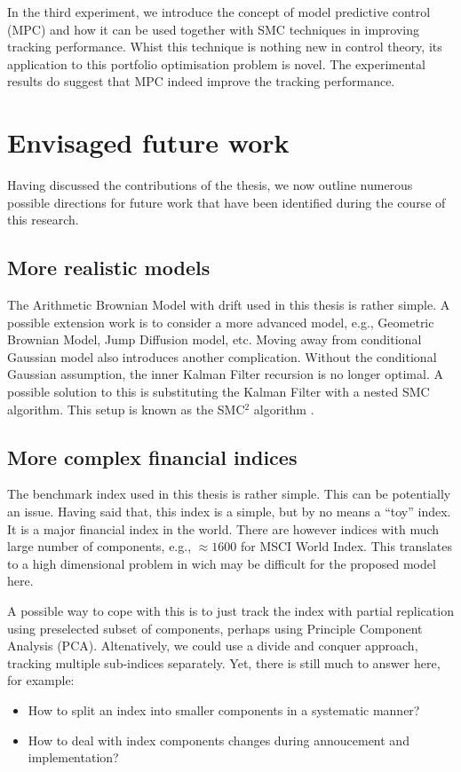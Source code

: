 In the third experiment, we introduce the concept of model predictive control (MPC) and how it can be used together with SMC techniques in improving tracking performance. Whist this technique is nothing new in control theory, its application to this portfolio optimisation problem is novel. The experimental results do suggest that MPC indeed improve the tracking performance.

\section{Envisaged future work}
Having discussed the contributions of the thesis, we now outline
numerous possible directions for future work that have been identified
during the course of this research.

\subsection{More realistic models}
The Arithmetic Brownian Model with drift used in this thesis is rather simple. A possible extension work is to consider a more advanced model, e.g., Geometric Brownian Model, Jump Diffusion model, etc. Moving away from conditional Gaussian model also introduces another complication. Without the conditional Gaussian assumption, the inner Kalman Filter recursion is no longer optimal. A possible solution to this is substituting the Kalman Filter with a nested SMC algorithm. This setup is known as the SMC$^2$ algorithm \cite{CN13}.

\subsection{More complex financial indices}
The benchmark index used in this thesis is rather simple. This can
be potentially an issue. Having said that, this index is a simple, but by no means a ``toy''
index. It is a major financial index in the world. There are however indices with much large number of components, e.g., $\approx 1600$ for MSCI World Index. This translates to a high dimensional problem in wich may be difficult for the proposed model here.

A possible way to cope with this is to just track the index with partial replication using preselected subset of components, perhaps using Principle Component Analysis (PCA). Altenatively, we could use a divide and conquer approach, tracking multiple sub-indices separately. Yet, there is still much to answer here, for example:
\begin{itemize}
\item How to split an index into smaller components in a systematic manner?
\item How to deal with index components changes during annoucement and implementation?
\end{itemize}


